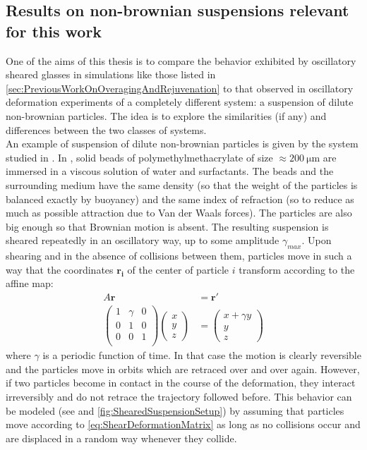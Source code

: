 \subsection{Results on non-brownian suspensions relevant for this work\label{sec:ShearedSuspensions}}

One of the aims of this thesis is to compare the behavior exhibited by oscillatory sheared glasses in simulations like those listed in \autoref{sec:PreviousWorkOnOveragingAndRejuvenation} to that observed in oscillatory deformation experiments of a completely different system: a suspension of dilute non-brownian particles. The idea is to explore the similarities (if any) and differences between the two classes of systems. \\
An example of suspension of dilute non-brownian particles is given by the system studied in \cite{corte2008random}. 
In \cite{corte2008random}, solid beads of polymethylmethacrylate of size $\approx \SI{200}{\micro\metre}$ are immersed in a viscous solution of water and surfactants. The beads and the surrounding medium have the same density (so that the weight of the particles is balanced exactly by buoyancy) and the same index of refraction (so to reduce as much as possible attraction due to Van der Waals forces). The particles are also big enough so that Brownian motion is absent. 
The resulting suspension is sheared repeatedly in an oscillatory way, up to some amplitude $\gamma_{max}$. Upon shearing and in the absence of collisions between them, particles move in such a way that the coordinates $\mathbf{r_{i}}$ of the center of particle $i$ transform according to the affine map:
\begin{align}
	A \mathbf{r} &= \mathbf{r'}\\
	\begin{pmatrix}
		1 & \gamma & 0 \\
		0 & 1 & 0 \\
		0 & 0 & 1 \\
	\end{pmatrix}
	\begin{pmatrix}
		x \\
		y \\
		z
	\end{pmatrix} &=  
	\begin{pmatrix}
		x + \gamma y \\
		y \\
		z
	\end{pmatrix}
	\label{eq:ShearDeformationMatrix}
\end{align} 
where $\gamma$ is a periodic function of time. In that case the motion is clearly reversible and the particles move in orbits which are retraced over and over again.
However, if two particles become in contact in the course of the deformation, they interact irreversibly and do not retrace the trajectory followed before. This behavior can be modeled (see \cite{corte2008random} and \autoref{fig:ShearedSuspensionSetup}) by assuming that particles move according to \autoref{eq:ShearDeformationMatrix} as long as no collisions occur and are displaced in a random way whenever they collide.\\

